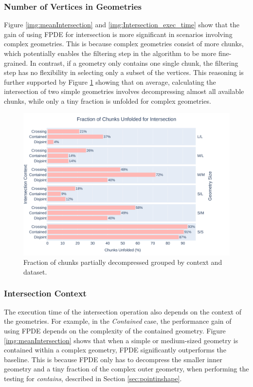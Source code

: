 \subsubsection{Number of Vertices in Geometries}
Figure \ref{img:meanIntersection} and \ref{img:Intersection_exec_time} show that the gain of using FPDE for intersection is more significant in scenarios involving complex geometries. This is because complex geometries consist of more chunks, which potentially enables the filtering step in the algorithm to be more fine-grained. In contrast, if a geometry only contains one single chunk, the filtering step has no flexibility in selecting only a subset of the vertices. This reasoning is further supported by Figure \ref{fig:chunks_unfold} showing that on average, calculating the intersection of two simple geometries involves decompressing almost all available chunks, while only a tiny fraction is unfolded for complex geometries.

\begin{figure}[htbp]
    \centering
    \includegraphics[width=15cm]{images/fraction_of_chunks_unfolded}
    \caption{Fraction of chunks partially decompressed grouped by context and dataset.}
    \label{fig:chunks_unfold}
\end{figure}

\subsubsection{Intersection Context}
The execution time of the intersection operation also depends on the context of the geometries. For example, in the \textit{Contained} case, the performance gain of using FPDE depends on the complexity of the contained geometry. Figure \ref{img:meanIntersection} shows that when a simple or medium-sized geometry is contained within a complex geometry, FPDE significantly outperforms the baseline. This is because FPDE only has to decompress the smaller inner geometry and a tiny fraction of the complex outer geometry, when performing the testing for \emph{contains}, described in Section \ref{sec:pointinshape}.

